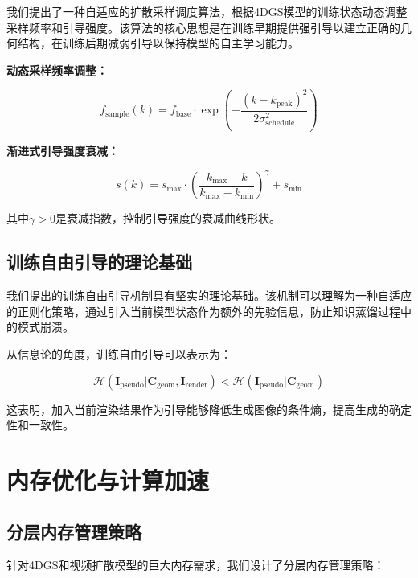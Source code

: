 我们提出了一种自适应的扩散采样调度算法，根据4DGS模型的训练状态动态调整采样频率和引导强度。该算法的核心思想是在训练早期提供强引导以建立正确的几何结构，在训练后期减弱引导以保持模型的自主学习能力。

\textbf{动态采样频率调整：}

\begin{equation}
f_{\text{sample}}(k) = f_{\text{base}} \cdot \exp\left(-\frac{(k - k_{\text{peak}})^2}{2\sigma_{\text{schedule}}^2}\right)
\label{eq:adaptive_sampling_frequency}
\end{equation}

\textbf{渐进式引导强度衰减：}

\begin{equation}
s(k) = s_{\max} \cdot \left(\frac{k_{\max} - k}{k_{\max} - k_{\min}}\right)^\gamma + s_{\min}
\label{eq:progressive_guidance_decay}
\end{equation}

其中$\gamma > 0$是衰减指数，控制引导强度的衰减曲线形状。

\subsection{训练自由引导的理论基础}

我们提出的训练自由引导机制具有坚实的理论基础。该机制可以理解为一种自适应的正则化策略，通过引入当前模型状态作为额外的先验信息，防止知识蒸馏过程中的模式崩溃。

从信息论的角度，训练自由引导可以表示为：

\begin{equation}
\mathcal{H}(\mathbf{I}_{\text{pseudo}}|\mathbf{C}_{\text{geom}}, \mathbf{I}_{\text{render}}) < \mathcal{H}(\mathbf{I}_{\text{pseudo}}|\mathbf{C}_{\text{geom}})
\label{eq:information_theoretic_guidance}
\end{equation}

这表明，加入当前渲染结果作为引导能够降低生成图像的条件熵，提高生成的确定性和一致性。

\section{内存优化与计算加速}

\subsection{分层内存管理策略}

针对4DGS和视频扩散模型的巨大内存需求，我们设计了分层内存管理策略：


